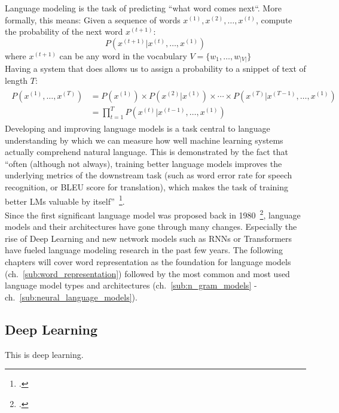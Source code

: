 Language modeling is the task of predicting “what word comes next“. More formally, this means:
Given a sequence of words $ x^{(1)}, x^{(2)}, \dots, x^{(t)} $, compute the probability of the next word $ x^{(t+1)} $:
\begin{equation}
    P(x^{(t+1)} | x^{(t)}, \dots, x^{(1)})
\end{equation}
where $ x^{(t+1)} $ can be any word in the vocabulary $ V = \{w_1, \dots, w_{|V|}\} $  \\
Having a system that does allows us to assign a probability to a snippet of text of length $ T $:
\begin{align}
    \begin{split}
    P(x^{(1)}, \dots, x^{(T)}) &= P(x^{(1)}) \times P(x^{(2)} | x^{(1)}) \times \cdots \times P(x^{(T)} | x^{(T-1)}, \dots, x^{(1)}) \\
    &= \prod_{t=1}^{T} P(x^{(t)} | x^{(t-1)}, \dots, x^{(1)})
    \end{split}
\end{align}
Developing and improving language models is a task central to language understanding by which we can measure how well machine learning systems actually comprehend natural language. This is demonstrated by the fact that “often (although not always), training better language models improves the underlying metrics of the downstream task (such as word error rate for speech recognition, or BLEU score for translation), which makes the task of training better LMs valuable by itself”~\footcite{DBLP:journals/corr/JozefowiczVSSW16}. \\
Since the first significant language model was proposed back in 1980~\footcite{880083}, language models and their architectures have gone through many changes. Especially the rise of Deep Learning and new network models such as RNNs or Transformers have fueled language modeling research in the past few years. The following chapters will cover word representation as the foundation for language models (ch.~\ref{sub:word_representation}) followed by the most common and most used language model types and architectures (ch.~\ref{sub:n_gram_models} - ch.~\ref{sub:neural_language_models}).







\subsection{Deep Learning}
\label{sec:deep_learning}

This is deep learning.
